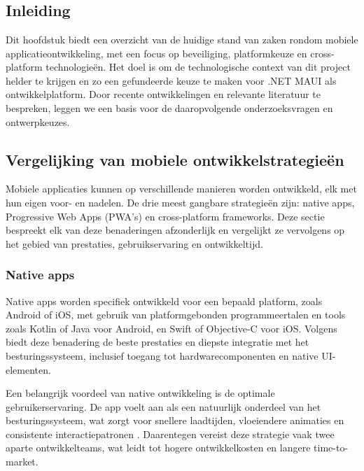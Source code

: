 \chapter{}
\label{ch:stand-van-zaken}

\section{Inleiding}
Dit hoofdstuk biedt een overzicht van de huidige stand van zaken rondom mobiele applicatieontwikkeling, met een focus op beveiliging, platformkeuze en cross-platform technologieën. Het doel is om de technologische context van dit project helder te krijgen en zo een gefundeerde keuze te maken voor .NET MAUI als ontwikkelplatform. Door recente ontwikkelingen en relevante literatuur te bespreken, leggen we een basis voor de daaropvolgende onderzoeksvragen en ontwerpkeuzes.

\section{Vergelijking van mobiele ontwikkelstrategieën}

Mobiele applicaties kunnen op verschillende manieren worden ontwikkeld, elk met hun eigen voor- en nadelen. De drie meest gangbare strategieën zijn: native apps, Progressive Web Apps (PWA's) en cross-platform frameworks. Deze sectie bespreekt elk van deze benaderingen afzonderlijk en vergelijkt ze vervolgens op het gebied van prestaties, gebruikservaring en ontwikkeltijd.

\subsection{Native apps}
Native apps worden specifiek ontwikkeld voor een bepaald platform, zoals Android of iOS, met gebruik van platformgebonden programmeertalen en tools zoals Kotlin of Java voor Android, en Swift of Objective-C voor iOS. Volgens \textcite{Bharadwaj2022} biedt deze benadering de beste prestaties en diepste integratie met het besturingssysteem, inclusief toegang tot hardwarecomponenten en native UI-elementen.

Een belangrijk voordeel van native ontwikkeling is de optimale gebruikerservaring. De app voelt aan als een natuurlijk onderdeel van het besturingssysteem, wat zorgt voor snellere laadtijden, vloeiendere animaties en consistente interactiepatronen \autocite{Pereira2024}. Daarentegen vereist deze strategie vaak twee aparte ontwikkelteams, wat leidt tot hogere ontwikkelkosten en langere time-to-market.

